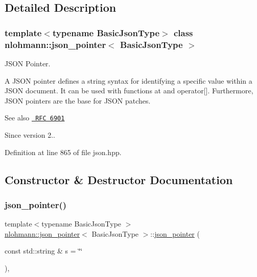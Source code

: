 \subsection{Detailed Description}
\subsubsection*{template$<$typename Basic\+Json\+Type$>$\newline
class nlohmann\+::json\+\_\+pointer$<$ Basic\+Json\+Type $>$}

J\+S\+ON Pointer. 

A J\+S\+ON pointer defines a string syntax for identifying a specific value within a J\+S\+ON document. It can be used with functions {\ttfamily at} and {\ttfamily operator\mbox{[}\mbox{]}}. Furthermore, J\+S\+ON pointers are the base for J\+S\+ON patches.

\begin{DoxySeeAlso}{See also}
\href{https://tools.ietf.org/html/rfc6901}{\texttt{ R\+FC 6901}}
\end{DoxySeeAlso}
\begin{DoxySince}{Since}
version 2.. 
\end{DoxySince}


Definition at line 865 of file json.\+hpp.



\subsection{Constructor \& Destructor Documentation}
\mbox{\label{classnlohmann_1_1json__pointer_a7f32d7c62841f0c4a6784cf741a6e4f8}} 
\subsubsection{\texorpdfstring{json\_pointer()}{json\_pointer()}}
{\footnotesize\ttfamily template$<$typename Basic\+Json\+Type $>$ \\
\mbox{\hyperlink{classnlohmann_1_1json__pointer}{nlohmann\+::json\+\_\+pointer}}$<$ Basic\+Json\+Type $>$\+::\mbox{\hyperlink{classnlohmann_1_1json__pointer}{json\+\_\+pointer}} (\begin{DoxyParamCaption}\item[{const std\+::string \&}]{s = {\ttfamily \char`\"{}\char`\"{}} }\end{DoxyParamCaption})\hspace{0.3cm}{\ttfamily [inline]}, {\ttfamily [explicit]}}



